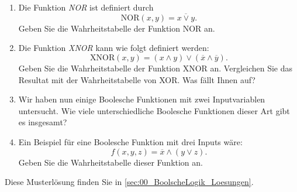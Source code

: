 \begin{myexercise}\label{myexercise:Wahrheitstabelle}
    \begin{enumerate}
        \item Die Funktion \emph{NOR} ist definiert durch 
        $$\mathrm{NOR}(x,y) = \overline{x\vee y}.$$
        Geben Sie die Wahrheitstabelle der Funktion NOR an.
        \item Die Funktion \emph{XNOR} kann wie folgt definiert werden:
        $$\mathrm{XNOR}(x,y) = (x\wedge y) \vee (\overline{x} \wedge \overline{y}).$$ 
        Geben Sie die Wahrheitstabelle der Funktion XNOR an. Vergleichen Sie das Resultat mit der Wahrheitstabelle von XOR. Was fällt Ihnen auf? 
        \item Wir haben nun einige Boolesche Funktionen mit zwei Inputvariablen untersucht. Wie viele unterschiedliche Boolesche Funktionen dieser Art gibt es insgesamt?
        \item Ein Beispiel für eine Boolesche Funktion mit drei Inputs wäre: $$f(x,y,z) = \overline{x} \wedge (y\vee z).$$ Geben Sie die Wahrheitstabelle dieser Funktion an.
    \end{enumerate}
    \begin{myanswer}
        Diese Musterlösung finden Sie in \cref{sec:00_BoolscheLogik_Loesungen}.
    \end{myanswer}
\end{myexercise}


